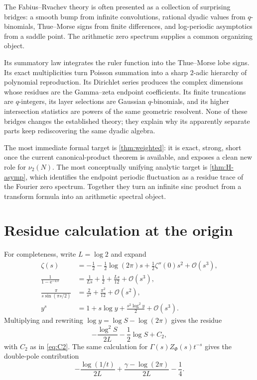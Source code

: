 \documentclass[11pt,oneside]{article}
\numberwithin{equation}{section}
\theoremstyle{definition}
\theoremstyle{remark}
\newcommand{\e}{\mathrm e}
\newcommand{\bigO}{\mathcal O}
\begin{document}
The Fabius--Rvachev theory is often presented as a collection of surprising
bridges: a smooth bump from infinite convolutions, rational dyadic values from
$q$-binomials, Thue--Morse signs from finite differences, and log-periodic
asymptotics from a saddle point.  The arithmetic zero spectrum supplies a common
organizing object.

Its summatory law integrates the ruler function into the Thue--Morse lobe signs.
Its exact multiplicities turn Poisson summation into a sharp $2$-adic hierarchy
of polynomial reproduction.  Its Dirichlet series produces the complex
dimensions whose residues are the Gamma--zeta endpoint coefficients.  Its finite
truncations are $q$-integers, its layer selections are Gaussian $q$-binomials,
and its higher intersection statistics are powers of the same geometric
resolvent.  None of these bridges changes the established theory; they explain
why its apparently separate parts keep rediscovering the same dyadic algebra.

The most immediate formal target is \cref{thm:weighted}: it is exact, strong,
short once the current canonical-product theorem is available, and exposes a
clean new role for $\nu_2(N)$.  The most conceptually unifying analytic target is
\cref{thm:H-asymp}, which identifies the endpoint periodic fluctuation as a
residue trace of the Fourier zero spectrum.  Together they turn an infinite sinc
product from a transform formula into an arithmetic spectral object.

\appendix

\section{Residue calculation at the origin}
\label{app:residue}

For completeness, write $L=\log2$ and expand
\begin{align*}
 \zeta(s)&=-\frac12-\frac12\log(2\pi)s+\frac12\zeta''(0)s^2+\bigO(s^3),\\
 \frac1{1-\e^{-Ls}}&=\frac1{Ls}+\frac12+\frac{Ls}{12}+\bigO(s^3),\\
 \frac{\pi}{s\sin(\pi s/2)}&=\frac2{s^2}+\frac{\pi^2}{12}+\bigO(s^2),\\
 y^s&=1+s\log y+\frac{s^2\log^2y}{2}+\bigO(s^3).
\end{align*}
Multiplying and rewriting $\log y=\log S-\log(2\pi)$ gives the residue
\[
 -\frac{\log^2S}{2L}-\frac12\log S+C_2,
\]
with $C_2$ as in \eqref{eq:C2}.  The same calculation for
$\Gamma(s)Z_\Phi(s)t^{-s}$ gives the double-pole contribution
\[
 -\frac{\log(1/t)}{2L}+\frac{\gamma-\log(2\pi)}{2L}-\frac14.
\]
\end{document}
